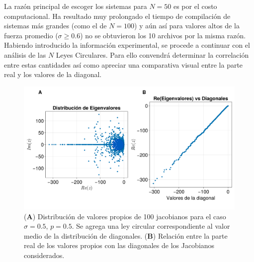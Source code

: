 La razón principal de escoger los sistemas para $N=50$ es por el costo computacional. Ha resultado muy prolongado el tiempo de compilación de sistemas más grandes (como el de $N=100$) y aún así para valores altos de la fuerza promedio ($\sigma\geq 0.6$) no se obtuvieron los 10 archivos por la misma razón. Habiendo introducido la información experimental, se procede a continuar con el análisis de las $N$ Leyes Circulares. Para ello convendrá determinar la correlación entre estas cantidades así como apreciar una comparativa visual entre la parte real y los valores de la diagonal.
\newpage
\begin{figure}[h!]
	\centering
	\includegraphics[scale=0.2]{../Imagenes/ReEvs-Diagonales}
	\caption{(\textbf{A}) Distribución de valores propios de 100 jacobianos para el caso $\sigma=0.5$, $p=0.5$. Se agrega una ley circular correspondiente al valor medio de la distribución de diagonales. (\textbf{B}) Relación entre la parte real de los valores propios con las diagonales de los Jacobianos considerados.}
	\label{fig:ReEvs-Diagonales}
\end{figure}

